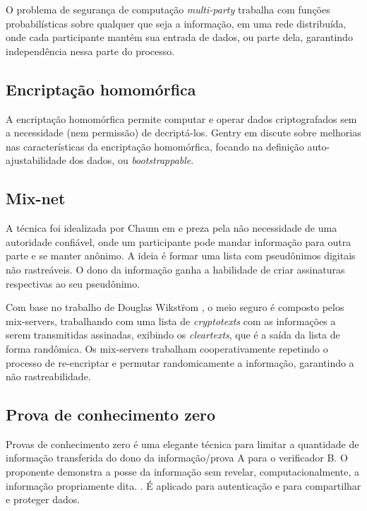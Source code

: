 \documentclass[letterpaper, 12 pt, conference]{ieeeconf}
\begin{document}
        O problema de segurança de computação \textit{multi-party} trabalha com funções probabilísticas sobre qualquer que seja a informação, em uma rede distribuída, onde cada participante mantém sua entrada de dados, ou parte dela, garantindo independência nessa parte do processo.

    \subsection{Encriptação homomórfica}
        A encriptação homomórfica permite computar e operar dados criptografados sem a necessidade (nem permissão) de decriptá-los. Gentry em \cite{gentry2009fully} discute sobre melhorias nas características da encriptação homomórfica, focando na definição auto-ajustabilidade dos dados, ou \textit{bootstrappable}.
    
    \subsection{Mix-net}
        A técnica foi idealizada por Chaum em \cite{Chaum1981untraceable} e preza pela não necessidade de uma autoridade confiável, onde um participante pode mandar informação para outra parte e se manter anônimo. A ideia é formar uma lista com pseudônimos digitais não rastreáveis. O dono da informação ganha a habilidade de criar assinaturas respectivas ao seu pseudônimo.
        
        Com base no trabalho de Douglas Wikstr̈om \cite{wikstrom2004universally}, o meio seguro é composto pelos mix-servers, trabalhando com uma lista de \textit{cryptotexts} com as informações a serem transmitidas assinadas, exibindo os \textit{cleartexts}, que é a saída da lista de forma randômica.
        Os mix-servers trabalham cooperativamente repetindo o processo de re-encriptar e permutar randomicamente a informação, garantindo a não rastreabilidade.
        
    \subsection{Prova de conhecimento zero}
        Provas de conhecimento zero é uma elegante técnica para limitar a quantidade de informação transferida do dono da informação/prova A para o verificador B. O proponente demonstra a posse da informação sem revelar, computacionalmente, a informação propriamente dita. 
        \cite{goldwasser1989knowledge}. É aplicado para autenticação e para compartilhar e proteger dados.
        
\end{document}

